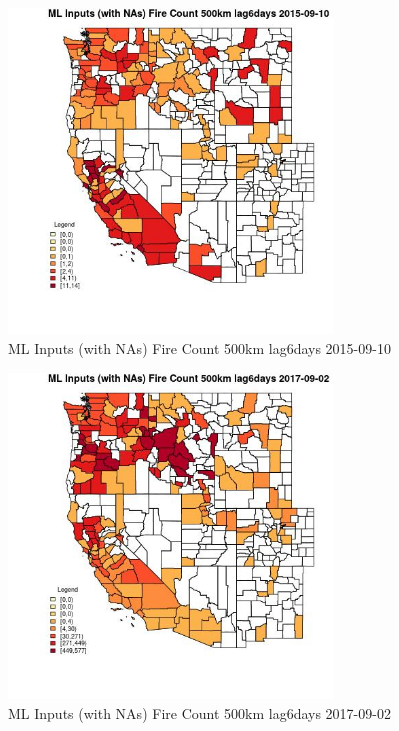 \begin{figure} 
\centering  
\includegraphics[width=0.77\textwidth]{Code_Outputs/Report_ML_input_PM25_Step4_part_e_de_duplicated_aves_compiled_2019-05-20wNAs_CountyFire_Count_500km_lag6daysMean2015-09-10.jpg} 
\caption{\label{fig:Report_ML_input_PM25_Step4_part_e_de_duplicated_aves_compiled_2019-05-20wNAsCountyFire_Count_500km_lag6daysMean2015-09-10}ML Inputs (with NAs) Fire Count 500km lag6days 2015-09-10} 
\end{figure} 
 

\begin{figure} 
\centering  
\includegraphics[width=0.77\textwidth]{Code_Outputs/Report_ML_input_PM25_Step4_part_e_de_duplicated_aves_compiled_2019-05-20wNAs_CountyFire_Count_500km_lag6daysMean2017-09-02.jpg} 
\caption{\label{fig:Report_ML_input_PM25_Step4_part_e_de_duplicated_aves_compiled_2019-05-20wNAsCountyFire_Count_500km_lag6daysMean2017-09-02}ML Inputs (with NAs) Fire Count 500km lag6days 2017-09-02} 
\end{figure} 
 


